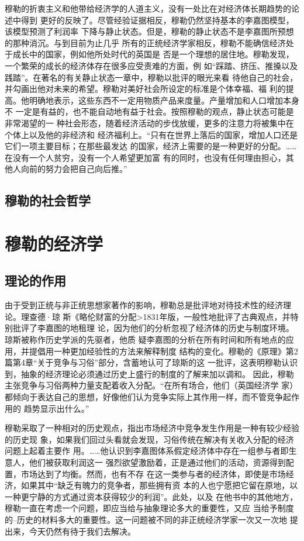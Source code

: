穆勒的折衷主义和他带给经济学的人道主义，没有一处比在对经济体长期趋势的论述中得到
更好的反映了。尽管经验证据相反，穆勒仍然坚持基本的李嘉图模型，该模型预测了利润率
下降与静止状态。但是，穆勒的静止状态不是李嘉图所预想的那种消沉。与到目前为止几乎
所有的正统经济学家相反，穆勒不能确信经济处于成长中的国家，例如他所处时代的英国是
否是一个理想的居住地。穆勒发现，一个繁荣的成长的经济体存在很多应受责难的方面，例
如“踩踏、挤压、推搡以及践踏”。在著名的有关静止状态一章中，穆勒以批评的眼光来看
待他自己的社会，并勾画出他对未来的希望。穆勒对美好社会所设定的标准是个体幸福、福
利的提高。他明确地表示，这些东西不一定用物质产品来度量。产量增加和人口增加本身不
一定是有益的，也不能自动地有益于社会。按照穆勒的观点，静止状态可能是非常渴望的一
种社会形态，随着经济活动的步伐放缓，更多的注意力将被集中在个体上以及他的非经济和
经济福利上。“只有在世界上落后的国家，增加人口还是它们一项主要目标；在那些最发达
的国家，经济上需要的是一种更好的分配。……在没有一个人贫穷，没有一个人希望更加富
有的同时，也没有任何理由担心，其他人向前的努力会把自己向后推。”

\subsection{穆勒的社会哲学}

\section{穆勒的经济学}

\subsection{理论的作用}

由于受到正统与非正统思想家著作的影响，穆勒总是批评地对待技术性的经济理论。理查德·琼
斯《略伦财富的分配>1831年版，一般性地批评了古典观点，并特别批评了李嘉图的地租理
论，因为他们的分析忽视了经济体的历史与制度环境。琼斯被称作历史学派的先驱者，他质
疑李嘉图的分析在所有时间和所有地点的应用，并提倡用一种更加经验性的方法来解释制度
结构的变化。穆勒的《原理》第2篇第4章“关于竞争与习俗”部分，含蓄地认可了琼斯的这
一批评，这表明穆勒认识到，抽象的经济理论必须通过历史上盛行的制度的了解来加以调和。
因此，穆勒主张竞争与习俗两种力量支配着收入分配。“在所有场合，他们（英国经济学
家）都倾向于表达自己的思想，好像他们认为竞争实际上其作用一样，而不管竞争起作用的
趋势显示出什么。”

穆勒采取了一种相对的历史观点，指出市场经济中竞争发生作用是一种有较少经验的历史现
象，如果我们回过头看就会发现，习俗传统在解决有关收入分配的经济问题上起着主要作
用。……他认识到李嘉图体系假定经济体中存在一组参与者即生意人，他们被获取利润这一
强烈欲望激励着，正是通过他们的活动，资源得到配置，市场达到了均衡。然而，也有不存
在这一类参与者的经济体，即使是市场经济，如果其中“缺乏有魄力的竞争者，那些拥有资
本的人也宁愿把它留在原地，以一种更宁静的方式通过资本获得较少的利润”。此处，以及
在他书中的其他地方，穆勒一直在考虑一个问题，即应当给与抽象理论多大的重要性，又应
当给予制度的--历史的材料多大的重要性。这一问题被不同的非正统经济学家一次又一次地
提出来，今天仍然有待于我们去解决。

